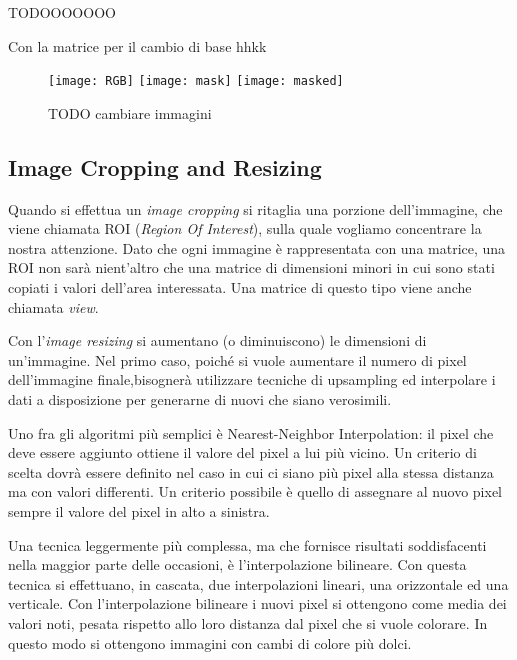 TODOOOOOOO

Con la matrice per il cambio di base hhkk
\begin{figure}[ht] %
  \begin{center}
    \texttt{[image: RGB]}
    \texttt{[image: mask]}
    \texttt{[image: masked]}
    \label{fig:traslation_example}
    \caption{TODO cambiare immagini}
  \end{center}
\end{figure}

\clearpage
\subsection {Image Cropping and Resizing}
Quando si effettua un \textit{image cropping} si ritaglia una porzione dell'immagine, che viene chiamata ROI (\textit{Region Of Interest}), sulla quale vogliamo concentrare la nostra attenzione.
Dato che ogni immagine è rappresentata con una matrice, una ROI non sarà nient'altro che una matrice di dimensioni minori in cui sono stati copiati i valori dell'area interessata.
Una matrice di questo tipo viene anche chiamata \textit{view}.

Con l'\textit{image resizing} si aumentano (o diminuiscono) le dimensioni di un'immagine.
Nel primo caso, poiché si vuole aumentare il numero di pixel dell'immagine finale,bisognerà utilizzare tecniche di upsampling ed interpolare i dati a disposizione per generarne di nuovi che siano verosimili.

Uno fra gli algoritmi più semplici è Nearest-Neighbor Interpolation:
il pixel che deve essere aggiunto ottiene il valore del pixel a lui più vicino.
Un criterio di scelta dovrà essere definito nel caso in cui ci siano più pixel alla stessa distanza ma con valori differenti.
Un criterio possibile è quello di assegnare al nuovo pixel sempre il valore del pixel in alto a sinistra.

Una tecnica leggermente più complessa, ma che fornisce risultati soddisfacenti nella maggior parte delle occasioni, è l'interpolazione bilineare.
Con questa tecnica si effettuano, in cascata, due interpolazioni lineari, una orizzontale ed una verticale.
Con l'interpolazione bilineare i nuovi pixel si ottengono come media dei valori noti, pesata rispetto allo loro distanza dal pixel che si vuole colorare.
In questo modo si ottengono immagini con cambi di colore più dolci.

